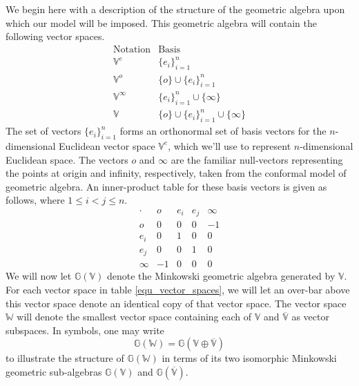 \documentclass{birkjour}
\theoremstyle{definition}
\theoremstyle{remark}
\numberwithin{equation}{section}
\newcommand{\G}{\mathbb{G}}
\newcommand{\V}{\mathbb{V}}
\newcommand{\Vb}{\mathbb{\overline{V}}}
\newcommand{\W}{\mathbb{W}}
\newcommand{\nvao}{o}
\newcommand{\nvai}{\infty}
\begin{document}
We begin here with a description of the structure of the geometric algebra upon
which our model will be imposed.  This
geometric algebra will contain the following vector spaces.
\begin{equation}\label{equ_vector_spaces}
\begin{array}{ll}
\mbox{Notation} & \mbox{Basis} \\
\hline
\V^e & \{e_i\}_{i=1}^n \\
\V^{\nvao} & \{\nvao\}\cup\{e_i\}_{i=1}^n \\
\V^{\nvai} & \{e_i\}_{i=1}^n\cup\{\nvai\} \\
\V & \{\nvao\}\cup\{e_i\}_{i=1}^n\cup\{\nvai\}
\end{array}
\end{equation}
The set of vectors $\{e_i\}_{i=1}^n$ forms an orthonormal set of basis
vectors for the $n$-dimensional Euclidean vector space $\V^e$, which we'll
use to represent $n$-dimensional Euclidean space.
The vectors $\nvao$ and $\nvai$ are the familiar null-vectors representing the
points at origin and infinity, respectively, taken from the conformal model of geometric algebra.
An inner-product table for these basis vectors is given as follows, where
$1\leq i<j\leq n$.
\begin{equation}
\begin{array}{c|cccc}
\cdot & \nvao & e_i & e_j & \nvai \\
\hline
\nvao & 0 & 0 & 0 & -1 \\
e_i & 0 & 1 & 0 & 0 \\
e_j & 0 & 0 & 1 & 0 \\
\nvai & -1 & 0 & 0 & 0
\end{array}
\end{equation}
We will now let $\G(\V)$ denote the Minkowski geometric algebra generated by $\V$.
For each vector space in table \eqref{equ_vector_spaces}, we will let an over-bar
above this vector space denote an identical copy of that vector space.  The vector
space $\W$ will denote the smallest vector space containing each of $\V$ and $\Vb$
as vector subspaces.  In symbols, one may write
\begin{equation}
\G(\W) = \G(\V\oplus\Vb)
\end{equation}
to illustrate the structure of $\G(\W)$ in terms of its two isomorphic Minkowski
geometric sub-algebras $\G(\V)$ and $\G(\Vb)$.
\end{document}
